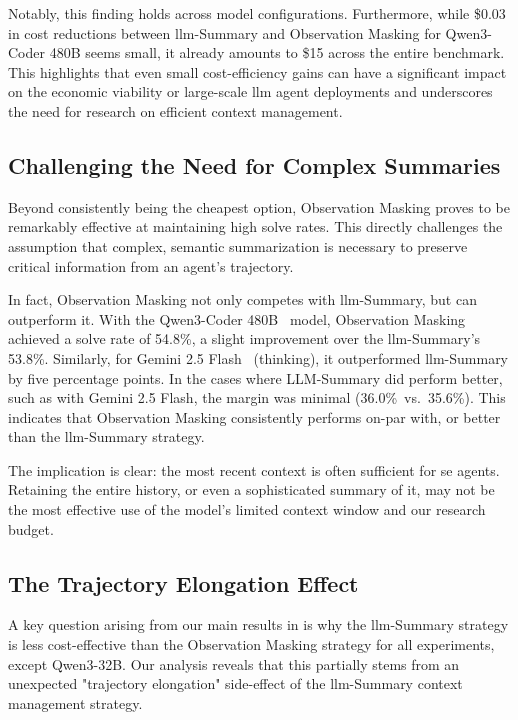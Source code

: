 \documentclass{article}
\begin{document}
Notably, this finding holds across model configurations. Furthermore, while \$0.03 in cost reductions between \ac{llm}-Summary and Observation Masking for Qwen3-Coder 480B seems small, it already amounts to \$15 across the entire benchmark. This highlights that even small cost-efficiency gains can have a significant impact on the economic viability or large-scale \ac{llm} agent deployments and underscores the need for research on efficient context management.

\subsection{Challenging the Need for Complex Summaries}
Beyond consistently being the cheapest option, Observation Masking proves to be remarkably effective at maintaining high solve rates. This directly challenges the assumption that complex, semantic summarization is necessary to preserve critical information from an agent's trajectory.

In fact, Observation Masking not only competes with \ac{llm}-Summary, but can outperform it. With the Qwen3-Coder 480B~\cite{qwen3technicalreport,hui2024qwen2} model, Observation Masking achieved a solve rate of 54.8\%, a slight improvement over the \ac{llm}-Summary's 53.8\%. Similarly, for Gemini 2.5 Flash~\cite{comanici_gemini_2025} (thinking), it outperformed \ac{llm}-Summary by five percentage points. In the cases where LLM-Summary did perform better, such as with Gemini 2.5 Flash, the margin was minimal (36.0\%\ vs.\ 35.6\%). This indicates that Observation Masking consistently performs on-par with, or better than the \ac{llm}-Summary strategy.

The implication is clear: the most recent context is often sufficient for \ac{se} agents. Retaining the entire history, or even a sophisticated summary of it, may not be the most effective use of the model's limited context window and our research budget.

\subsection{The Trajectory Elongation Effect}
\label{subsec:main-results:elongation}
A key question arising from our main results in  is why the \ac{llm}-Summary strategy is less cost-effective than the Observation Masking strategy for all experiments, except Qwen3-32B. Our analysis reveals that this partially stems from an unexpected "trajectory elongation" side-effect of the \ac{llm}-Summary context management strategy.
\end{document}
